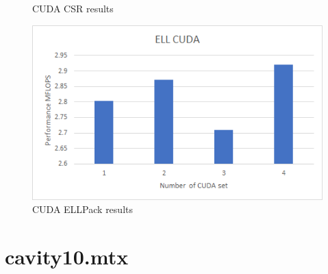 \documentclass{scrreprt}
\begin{document}
\begin{figure}[ht]
\begin{minipage}[b]{0.5\linewidth}
    \caption{CUDA CSR results} 
    \vspace{4ex}
  \end{minipage}%
  \begin{minipage}[b]{0.5\linewidth}
    \centering
    \includegraphics[width=.9\linewidth]{rdist2ELLCUDA.png} 
    \caption{CUDA ELLPack  results} 
    \vspace{4ex}
  \end{minipage} 
\end{figure}
\FloatBarrier




\section{cavity10.mtx}
\end{document}
